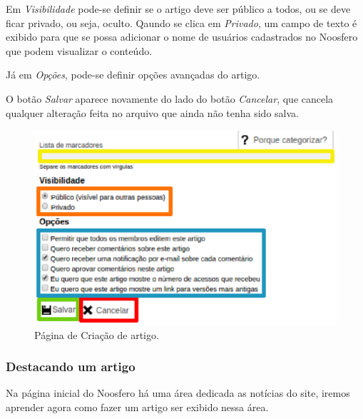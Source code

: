 Em \emph{\color{orange}Visibilidade} pode-se definir se o artigo deve ser público a todos, ou se deve ficar privado, ou seja, oculto. Qaundo se clica em \emph{Privado}, um campo de texto é exibido para que se possa adicionar o nome de usuários cadastrados no Noosfero que podem visualizar o conteúdo.

Já em \emph{\color{blue}Opções}, pode-se definir opções avançadas do artigo.

O botão \emph{\color{green}Salvar} aparece novamente do lado do botão \emph{\color{red}Cancelar}, que cancela qualquer alteração feita no arquivo que ainda não tenha sido salva.

\begin{figure}[H]
  \centering
    \includegraphics[keepaspectratio=true,scale=0.7]{figuras/opcoesArtigo.eps}
  \caption{Página de Criação de artigo.}
  \label{fig:FormCriacaoPasta}
\end{figure}

\newpage
\subsubsection{Destacando um artigo}
\label{subsubsec:detacandoArtigo}

Na página inicial do Noosfero há uma área dedicada as notícias do site, iremos aprender agora como fazer um artigo ser exibido nessa área.

